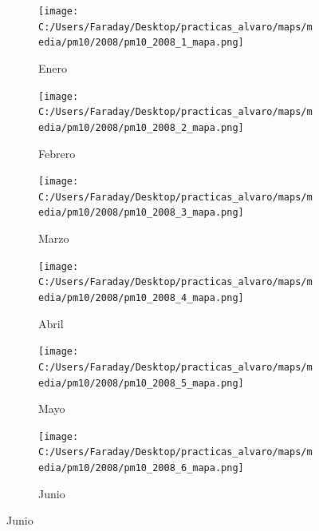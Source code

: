 \documentclass[12pt]{article}
\begin{document}
\begin{figure}[H]
\centering
\begin{subfigure}[H]{0.15\textwidth}
\texttt{[image: C:/Users/Faraday/Desktop/practicas\_alvaro/maps/media/pm10/2008/pm10\_2008\_1\_mapa.png]}
\captionsetup{labelformat=empty}
\caption{Enero}
\label{fig:map-pm10-2008-1}
\end{subfigure}
%
\begin{subfigure}[H]{0.15\textwidth}
\texttt{[image: C:/Users/Faraday/Desktop/practicas\_alvaro/maps/media/pm10/2008/pm10\_2008\_2\_mapa.png]}
\captionsetup{labelformat=empty}
\caption{Febrero}
\label{fig:map-pm10-2008-2}
\end{subfigure}
%
\begin{subfigure}[H]{0.15\textwidth}
\texttt{[image: C:/Users/Faraday/Desktop/practicas\_alvaro/maps/media/pm10/2008/pm10\_2008\_3\_mapa.png]}
\captionsetup{labelformat=empty}
\caption{Marzo}
\label{fig:map-pm10-2008-3}
\end{subfigure}
%
\begin{subfigure}[H]{0.15\textwidth}
\texttt{[image: C:/Users/Faraday/Desktop/practicas\_alvaro/maps/media/pm10/2008/pm10\_2008\_4\_mapa.png]}
\captionsetup{labelformat=empty}
\caption{Abril}
\label{fig:map-pm10-2008-4}
\end{subfigure}
%
\begin{subfigure}[H]{0.15\textwidth}
\texttt{[image: C:/Users/Faraday/Desktop/practicas\_alvaro/maps/media/pm10/2008/pm10\_2008\_5\_mapa.png]}
\captionsetup{labelformat=empty}
\caption{Mayo}
\label{fig:map-pm10-2008-5}
\end{subfigure}
%
\begin{subfigure}[H]{0.15\textwidth}
\texttt{[image: C:/Users/Faraday/Desktop/practicas\_alvaro/maps/media/pm10/2008/pm10\_2008\_6\_mapa.png]}
\captionsetup{labelformat=empty}
\caption{Junio}
\label{fig:map-pm10-2008-6}
\end{subfigure}


\end{figure}
\end{document}

